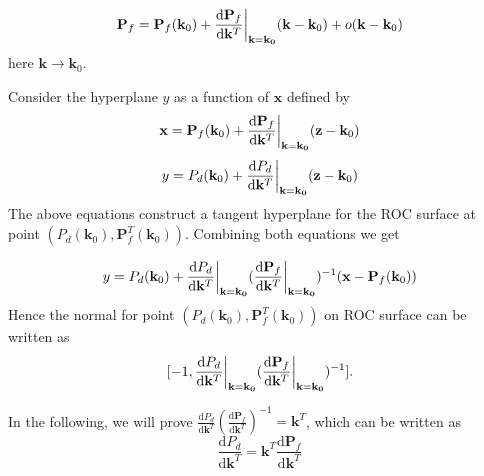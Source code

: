 \documentclass[12pt,journal,a4paper,twoside,onecolumn,draft]{IEEEtran}
\begin{document}
\begin{spacing}{2.5}
\begin{equation}
\label{pro: pf}
\mathbf{P}_f = \mathbf{P}_f(\mathbf{k}_0) + \frac{\mathrm{d}\mathbf{P}_f}{\mathrm{d}\mathbf{k}^T}\bigg{|}_{\mathbf{k}=\mathbf{k_0}}(\mathbf{k} - \mathbf{k}_0)
+ o(\mathbf{k} - \mathbf{k}_0)
\end{equation}
here $\mathbf{k} \rightarrow \mathbf{k}_0$.

Consider the hyperplane $y$ as a function of $\mathbf{x}$ defined by
\begin{equation}
\label{pro: x}
\mathbf{x} = \mathbf{P}_f(\mathbf{k}_0) + \frac{\mathrm{d}\mathbf{P}_f}{\mathrm{d}\mathbf{k}^T}\bigg{|}_{\mathbf{k}=\mathbf{k_0}}(\mathbf{z} - \mathbf{k}_0)
\end{equation}
\begin{equation}
\label{pro: y}
y = P_d(\mathbf{k}_0) + \frac{\mathrm{d}P_d}{\mathrm{d}\mathbf{k}^T}\bigg{|}_{\mathbf{k}=\mathbf{k_0}}(\mathbf{z} - \mathbf{k}_0)
\end{equation}
The above equations construct a tangent hyperplane for the ROC surface at point $(P_d(\mathbf{k}_0), \mathbf{P}_f^T(\mathbf{k}_0))$. Combining both equations  we get

\begin{equation}
\label{pro : y2}
y = P_d(\mathbf{k}_0) + \frac{\mathrm{d}P_d}{\mathrm{d}\mathbf{k}^T}\bigg{|}_{\mathbf{k}=\mathbf{k_0}}(
\frac{\mathrm{d}\mathbf{P}_f}{\mathrm{d}\mathbf{k}^T}\bigg{|}_{\mathbf{k}=\mathbf{k_0}}
)^{-1} (\mathbf{x} - \mathbf{P}_f(\mathbf{k}_0))
\end{equation}
Hence the normal for point $(P_d(\mathbf{k}_0), \mathbf{P}_f^T(\mathbf{k}_0))$ on ROC surface can be written as
\begin{equation}
\label{vec: normal}
[-1, \frac{\mathrm{d}P_d}{\mathrm{d}\mathbf{k}^T}\bigg{|}_{\mathbf{k}=\mathbf{k_0}}(
\frac{\mathrm{d}\mathbf{P}_f}{\mathrm{d}\mathbf{k}^T}\bigg{|}_{\mathbf{k}=\mathbf{k_0}}
)^{-1}
].
\end{equation}

In the following, we will prove $ \frac{\mathrm{d}P_d}{\mathrm{d}\mathbf{k}^T}(
\frac{\mathrm{d}\mathbf{P}_f}{\mathrm{d}\mathbf{k}^T}
)^{-1} = \mathbf{k}^T
$, which can be written as
\begin{equation}
\label{pro: vec}
\frac{\mathrm{d}P_d}{\mathrm{d}\mathbf{k}^T} = \mathbf{k}^T \frac{\mathrm{d}\mathbf{P}_f}{\mathrm{d}\mathbf{k}^T}
\end{equation}


\end{spacing}
\end{document}
